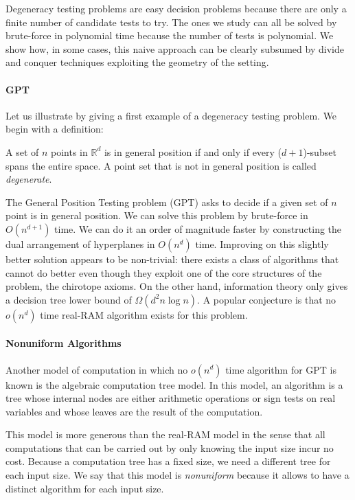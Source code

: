 Degeneracy testing problems are easy decision problems because there are only
a finite number of candidate tests to try. The ones we study can all be solved
by brute-force in polynomial time because the number of tests is polynomial.
We show how, in some cases, this naive approach can be clearly subsumed by
divide and conquer techniques exploiting the geometry of the setting.

\paragraph{GPT}
Let us illustrate by giving a first example of a degeneracy testing problem. We
begin with a definition:

\begin{definition}
A set of \(n\) points in \(\mathbb{R}^d\)
is in general position if and only if every (\(d+1\))-subset spans the entire
space. A point set that is not in general position is called \emph{degenerate}.
\end{definition}

The General Position Testing problem (GPT) asks to decide if a given set of
\(n\) point is in general position. We can solve this problem by brute-force in
\(O(n^{d+1})\) time.
We can do it an order of magnitude faster
by constructing the dual arrangement of hyperplanes in
\(O(n^d)\) time.
Improving on this slightly better solution appears to be non-trivial: there
exists a class of algorithms that cannot do better even though they
exploit one of the core structures of the problem, the chirotope axioms.
On the other hand, information theory only gives a decision tree
lower bound of \(\Omega(d^2 n \log n)\).
A popular conjecture is that no \(o(n^d)\) time real-RAM
algorithm exists for this problem.

\paragraph{Nonuniform Algorithms}
Another model of computation in which no \(o(n^d)\) time algorithm for GPT
is known is the algebraic computation tree model. In this model,
an algorithm is a tree whose internal nodes are either arithmetic operations or
sign tests on real variables and whose leaves are the result of the computation.

This model is
more generous than the real-RAM model in the sense that all computations that
can be carried out by only knowing the input size incur no cost.
%
Because a computation tree has a fixed size, we need a different tree for each
input size.
%
We say that this model is \emph{nonuniform} because it allows to have a
distinct algorithm for each input size.

